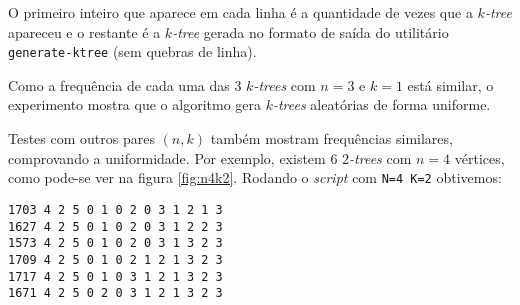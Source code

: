 O primeiro inteiro que aparece em cada linha é a quantidade de vezes que a \emph{$k$-tree} apareceu e o restante é a \emph{$k$-tree} gerada no formato de saída do utilitário {\tt generate-ktree} (sem quebras de linha).

Como a frequência de cada uma das $3$ \emph{$k$-trees} com $n = 3$ e $k = 1$ está similar, o experimento mostra que o algoritmo gera \emph{$k$-trees} aleatórias de forma uniforme.

Testes com outros pares $(n, k)$ também mostram frequências similares, comprovando a uniformidade. Por exemplo, existem 6 \emph{$2$-trees} com $n = 4$ vértices, como pode-se ver na figura \ref{fig:n4k2}. Rodando o \emph{script} com {\tt N=4 K=2} obtivemos:

\begin{lstlisting}
1703 4 2 5 0 1 0 2 0 3 1 2 1 3
1627 4 2 5 0 1 0 2 0 3 1 2 2 3
1573 4 2 5 0 1 0 2 0 3 1 3 2 3
1709 4 2 5 0 1 0 2 1 2 1 3 2 3
1717 4 2 5 0 1 0 3 1 2 1 3 2 3
1671 4 2 5 0 2 0 3 1 2 1 3 2 3
\end{lstlisting}

